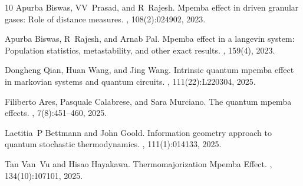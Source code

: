 \documentclass{amsart}
\theoremstyle{definition}
\begin{document}
\begin{thebibliography}{10}
Apurba Biswas, VV~Prasad, and R~Rajesh.
\newblock Mpemba effect in driven granular gases: Role of distance measures.
, 108(2):024902, 2023.

Apurba Biswas, R~Rajesh, and Arnab Pal.
\newblock Mpemba effect in a langevin system: Population statistics,
  metastability, and other exact results.
, 159(4), 2023.

Dongheng Qian, Huan Wang, and Jing Wang.
\newblock Intrinsic quantum mpemba effect in markovian systems and quantum
  circuits.
, 111(22):L220304, 2025.

Filiberto Ares, Pasquale Calabrese, and Sara Murciano.
\newblock The quantum mpemba effects.
, 7(8):451--460, 2025.

Laetitia~P Bettmann and John Goold.
\newblock Information geometry approach to quantum stochastic thermodynamics.
, 111(1):014133, 2025.

Tan Van~Vu and Hisao Hayakawa.
\newblock Thermomajorization {Mpemba} {Effect}.
, 134(10):107101, 2025.

\end{thebibliography}
\end{document}
